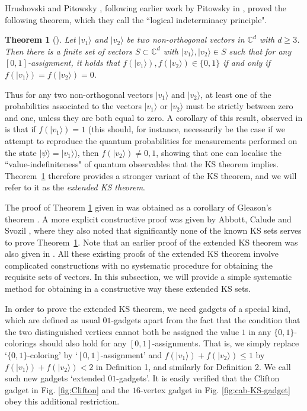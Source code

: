 \documentclass[twocolumn, a4paper, superscriptaddress,nofootinbib, accepted=2020-08-07, hyperref]{quantumarticle}
\newtheorem{theorem}{Theorem}
\begin{document}
Hrushovski and Pitowsky \cite{HP03}, following earlier work by Pitowsky in \cite{Pitowsky}, proved the following theorem, which they call the ``logical indeterminacy principle".
\begin{theorem}[\cite{HP03}]
	\label{thm:HP03}
	Let $|v_1 \rangle$ and $|v_2 \rangle$ be two non-orthogonal vectors in $\mathbb{C}^d$ with $d \geq 3$. Then there is a finite set of vectors $S \subset \mathbb{C}^d$ with $|v_1 \rangle, |v_2 \rangle \in S$ such that 
	for any $[0,1]$-assignment, it holds that $f(|v_1 \rangle), f(|v_2 \rangle) \in \{0, 1\}$ if and only if $f(|v_1\rangle) = f(|v_2\rangle) = 0$. 
\end{theorem}
Thus for any two non-orthogonal vectors $|v_1\rangle$ and $|v_2\rangle$, at least one of the probabilities associated to the  vectors $|v_1\rangle$ or $|v_2\rangle$ must be strictly between zero and one, unless they are both equal to zero. A corollary of this result, observed in \cite{ACCS12, ACS14, ACS14-2} is that if $f(|v_1 \rangle) = 1$ (this should, for instance, necessarily be the case if we attempt to reproduce the quantum probabilities for measurements performed on the state $|\psi\rangle=|v_1\rangle$), then $f(|v_2 \rangle) \neq 0,1$, showing that one can localise the ``value-indefiniteness" of quantum observables that the KS theorem implies. Theorem~\ref{thm:HP03} therefore provides a stronger variant of the KS theorem, and we will refer to it as the \emph{extended KS theorem}. 

The proof of Theorem \ref{thm:HP03} given in \cite{HP03} was obtained as a corollary of Gleason's theorem \cite{Gleason}.
A more explicit constructive proof was given by Abbott, Calude and Svozil \cite{ACCS12, ACS14}, where they also noted that significantly none of the known KS sets serves to prove Theorem~\ref{thm:HP03}. Note that an earlier proof of the extended KS theorem was also given in \cite{Pitowsky}. All these existing proofs of the extended KS theorem involve complicated constructions with no systematic procedure for obtaining the requisite sets of vectors. In this subsection, we will provide a simple systematic method for obtaining in a constructive way these extended KS sets. 

In order to prove the extended KS theorem, we need gadgets of a special kind, which are defined as  usual $01$-gadgets apart from the fact that the condition that the two distinguished vertices cannot both be assigned the value $1$ in any $\{0,1\}$-colorings should also hold for any $[0,1]$-assignments. That is, we simply replace `$\{0,1\}$-coloring' by `$[0,1]$-assignment' and $f(|v_1\rangle)+f(|v_2\rangle)\leq 1$ by $f(|v_1\rangle)+f(|v_2\rangle)<2$ in Definition 1, and similarly for Definition 2. We call such new gadgets `extended $01$-gadgets'.  It is easily verified that the Clifton gadget in Fig. \ref{fig:Clifton} and the $16$-vertex gadget in Fig. \ref{fig:cab-KS-gadget} obey this additional restriction. 
\end{document}
